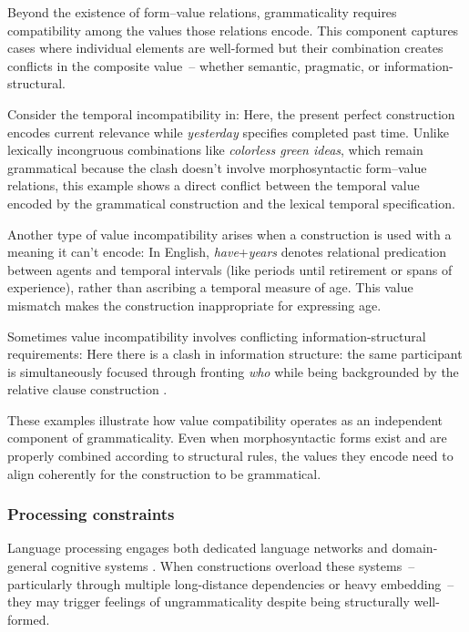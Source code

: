 \documentclass[12pt,letterpaper]{article}
\newcommand{\mention}[1]{\textit{#1}}
\begin{document}
Beyond the existence of form--value relations, grammaticality requires compatibility among the values those relations encode. This component captures cases where individual elements are well-formed but their combination creates conflicts in the composite value~-- whether semantic, pragmatic, or information-structural.

Consider the temporal incompatibility in:
\ea[*]{\mention{I've finished it yesterday.}}\label{ex:tense-sem}
\z
Here, the present perfect construction encodes current relevance while \mention{yesterday} specifies completed past time. Unlike lexically incongruous combinations like \mention{colorless green ideas}, which remain grammatical because the clash doesn't involve morphosyntactic form--value relations, this example shows a direct conflict between the temporal value encoded by the grammatical construction and the lexical temporal specification.

Another type of value incompatibility arises when a construction is used with a meaning it can't encode:
\label{ex:have-years-sem}
\z
In English, \mention{have}+\mention{years} denotes relational predication between agents and temporal intervals (like periods until retirement or spans of experience), rather than ascribing a temporal measure of age. This value mismatch makes the construction inappropriate for expressing age.

Sometimes value incompatibility involves conflicting information-structural requirements:
\z
Here there is a clash in information structure: the same participant is simultaneously focused through fronting \mention{who} while being backgrounded by the relative clause construction \autocite{cuneogoldberg2023}.

These examples illustrate how value compatibility operates as an independent component of grammaticality. Even when morphosyntactic forms exist and are properly combined according to structural rules, the values they encode need to align coherently for the construction to be grammatical.

\subsubsection{Processing constraints}\label{sec:processing-constraints}

Language processing engages both dedicated language networks and domain-general cognitive systems \autocite{Fedorenko2024}. When constructions overload these systems~--  particularly through multiple long-distance dependencies or heavy embedding~--  they may trigger feelings of ungrammaticality despite being structurally well-formed.
\end{document}
